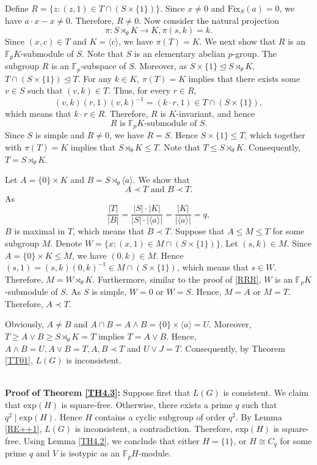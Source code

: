 \documentclass[12pt]{article}
\def\QEDopen{{\setlength{\fboxsep}{0pt}\setlength{\fboxrule}{0.2pt}\fbox{\rule[0pt]{0pt}{1.3ex}\rule[0pt]{1.3ex}{0pt}}}}
\def\QED{\QEDopen}
\def\endproof{\hspace*{\fill}~\QED\par\endtrivlist\unskip}
\begin{document}
Define $R=\{z: (z,1)\in T\cap (S\times\{1\})\}$. Since $x\neq 0$ and $\mbox{Fix}_S(a)=0$, we have $a\cdot x-x\neq 0$. Therefore, $R\neq 0$. 
Now consider the natural projection $$\pi: S\rtimes_{\theta} K \longrightarrow K, \pi(s, k)=k.$$
Since $(x, c)\in T$ and $K=\langle c \rangle$, we have $\pi(T)=K$. We next show that $R$ is an $\mathbb{F}_pK$-submodule of $S$.
Note that $S$ is an elementary abelian $p$-group. The subgroup $R$ is an $\mathbb{F}_p$-subspace of $S$. 
Moreover, as $S\times \{1\} \unlhd S\rtimes_\theta K$, $T\cap (S\times \{1\})\unlhd T$. For any $k\in K$, $\pi(T)=K$ implies that there 
exists some $v\in S$ such that $(v, k)\in T$. Thus, for every $r\in R$, $$(v, k)(r, 1)(v, k)^{-1}=(k\cdot r, 1)\in T\cap (S\times\{1\}),$$
which means that $k\cdot r\in R$. Therefore, $R$ is $K$-invariant, and hence 
\begin{equation}\label{RRR}
R \mbox{ is }\mathbb{F}_pK\mbox{-submodule of } S.
\end{equation} Since $S$ is simple and $R\neq 0$, we have $R=S$. 
Hence $S\times\{1\}\leq T$, which together with $\pi(T)=K$ implies that $S\rtimes_{\theta} K\leq T$. Note that $T\leq S\rtimes_{\theta} K$. 
Consequently, $T=S\rtimes_{\theta} K$.

Let $A=\{0\}\times K$ and $B=S\rtimes_\theta \langle a\rangle$. We show that $$A\prec T \mbox{ and }B\prec T.$$ 
As $$\frac{|T|}{|B|}=\frac{|S|\cdot |K|}{|S|\cdot|\langle a\rangle|}=\frac{|K|}{|\langle a\rangle|}=q,$$ $B$ is maximal in $T$, which means that $B\prec T$. 
Suppose that $A\leq M\leq T$ for some subgroup $M$. Denote $W=\{x: (x,1)\in M\cap (S\times\{1\})\}$. Let $(s,k)\in M$. Since $A=\{0\}\times K\le M$, we have $(0,k)\in M$. Hence
$(s,1)=(s,k)(0,k)^{-1}\in M\cap (S\times\{1\})$, which means that $s\in W$. Therefore, $M=W\rtimes_\theta K$. Furthermore, similar to the proof of \eqref{RRR}, $W$ is an $\mathbb{F}_pK$-submodule of $S$. As $S$ is 
simple, $W=0$ or $W=S$. Hence, $M=A$ or $M=T$. Therefore, $A\prec T$. 

Obviously, $A\neq B$ and $A\cap B=A\wedge B=\{0\}\times \langle a\rangle=U$. Moreover, $T\geq A\vee B\geq S\rtimes_{\theta} K=T$ implies $T=A\vee B$. 
Hence, $A\wedge B=U, A\vee B=T, A, B\prec T$ and $U\vee J=T$. Consequently, by Theorem \ref{TT01}, $L(G)$ is inconsistent.
\endproof

\quad\\
\textbf{Proof of Theorem \ref{TH4.3}:}
Suppose first that $L(G)$ is consistent. We claim that $\mbox{exp}(H)$ is square-free. Otherwise, there exists a prime $q$ such that $q^2\mid\mbox{exp}(H)$. 
Hence $H$ contains a cyclic subgroup of order $q^2$. By Lemma \ref{RE++1}, $L(G)$ is inconsistent, a contradiction. Therefore, $\mbox{exp}(H)$ is square-free.
Using Lemma \ref{TH4.2}, we conclude that either $H=\{1\}$, or $H\cong C_q$ for some prime $q$ and $V$ is isotypic as an $\mathbb{F}_pH$-module.
\end{document}

